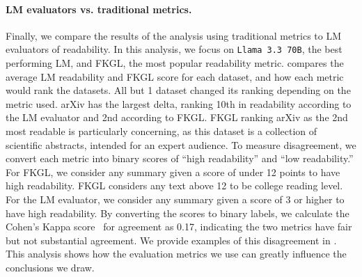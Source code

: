 


\paragraph{LM evaluators vs. traditional metrics.} Finally, we compare the results of the analysis using traditional metrics to LM evaluators of readability. In this analysis, we focus on \texttt{Llama 3.3 70B}, the best performing LM, and FKGL, the most popular readability metric.  compares the average LM readability and FKGL score for each dataset, and how each metric would rank the datasets. All but 1 dataset changed its ranking depending on the metric used. arXiv has the largest delta, ranking 10th in readability according to the LM evaluator and 2nd according to FKGL. FKGL ranking arXiv as the 2nd most readable is particularly concerning, as this dataset is a collection of scientific abstracts, intended for an expert audience.
To measure disagreement, we convert each metric into binary scores of ``high readability'' and ``low readability.'' For FKGL, we consider any summary given a score of under 12 points to have high readability. FKGL considers any text above 12 to be college reading level. For the LM evaluator, we consider any summary given a score of 3 or higher to have high readability. By converting the scores to binary labels, we calculate the Cohen's Kappa score~\cite{McHugh2012InterraterRT} for agreement as 0.17, indicating the two metrics have fair but not substantial agreement. We provide examples of this disagreement in . This analysis shows how the evaluation metrics we use can greatly influence the conclusions we draw. 




